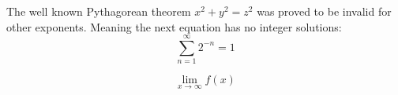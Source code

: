 \documentclass{article}
\begin{document}
The well known Pythagorean theorem \(x^2 + y^2 = z^2\) was 
proved to be invalid for other exponents. 
Meaning the next equation has no integer solutions:
\[ \sum_{n=1}^{\infty} 2^{-n} = 1 \]

\[ \lim_{x\to\infty} f(x) \]
\end{document}
